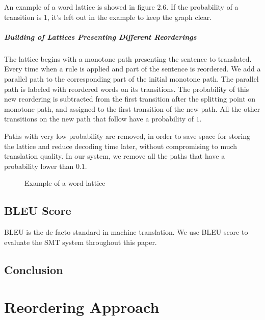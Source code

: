 An example of a word lattice is showed in figure $2.6$. If the probability of a transition is $1$, it's left out in the example to keep the graph clear.

\paragraph{Building of Lattices Presenting Different Reorderings}

The lattice begins with a monotone path presenting the sentence to translated. Every time when a rule is applied and part of the sentence is reordered. We add a parallel path to the corresponding part of the initial monotone path. The parallel path is labeled with reordered words on its transitions. The probability of this new reordering is subtracted from the first transition after the splitting point on monotone path, and assigned to the first transition of the new path. All the other transitions on the new path that follow have a probability of $1$.


Paths with very low probability are removed, in order to save space for storing the lattice and reduce decoding time later, without compromising to much translation quality. In our system, we remove all the paths that have a probability lower than $0.1$.



\begin{landscape}
\begin{figure}
\centering

\caption{Example of a word lattice}
\end{figure}
\end{landscape}

\section{BLEU Score}
\label{ch:Foundations:sec:bleu}
BLEU is the de facto standard in machine translation\cite{metrics}. We use BLEU score to evaluate the SMT system throughout this paper.


\section{Conclusion}

\chapter{Reordering Approach}
\label{ch:ReorderingApproach}

